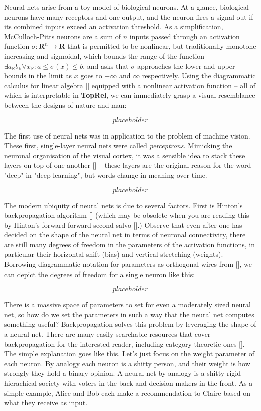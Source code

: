 \begin{fullwidth}
Neural nets arise from a toy model of biological neurons. At a glance, biological neurons have many receptors and one output, and the neuron fires a signal out if its combined inputs exceed an activation threshold. As a simplification, McCulloch-Pitts neurons are a sum of $n$ inputs passed through an activation function $\sigma: \mathbf{R}^n \rightarrow \mathbf{R}$ that is permitted to be nonlinear, but traditionally monotone increasing and sigmoidal, which bounds the range of the function $\exists a_{\mathbb{R}} b_{\mathbb{R}} \forall x_{\mathbb{R}} : a \leq \sigma(x) \leq b$, and asks that $\sigma$ approaches the lower and upper bounds in the limit as $x$ goes to $-\infty$ and $\infty$ respectively. Using the diagrammatic calculus for linear algebra [] equipped with a nonlinear activation function -- all of which is interpretable in \textbf{TopRel}, we can immediately grasp a visual resemblance between the designs of nature and man:

\[placeholder\]

The first use of neural nets was in application to the problem of machine vision. These first, single-layer neural nets were called \emph{perceptrons}. Mimicking the neuronal organisation of the visual cortex, it was a sensible idea to stack these layers on top of one another [] -- these layers are the original reason for the word "deep" in "deep learning", but words change in meaning over time.

\[placeholder\]

The modern ubiquity of neural nets is due to several factors. First is Hinton's backpropagation algorithm [] (which may be obsolete when you are reading this by Hinton's forward-forward second salvo [].) Observe that even after one has decided on the shape of the neural net in terms of neuronal connectivity, there are still many degrees of freedom in the parameters of the activation functions, in particular their horizontal shift (bias) and vertical stretching (weights). Borrowing diagrammatic notation for parameters as orthogonal wires from [], we can depict the degrees of freedom for a single neuron like this:

\[placeholder\]

There is a massive space of parameters to set for even a moderately sized neural net, so how do we set the parameters in such a way that the neural net computes something useful? Backpropagation solves this problem by leveraging the shape of a neural net. There are many easily searchable resources that cover backpropagation for the interested reader, including category-theoretic ones []. The simple explanation goes like this. Let's just focus on the weight parameter of each neuron. By analogy each neuron is a shitty person, and their weight is how strongly they hold a binary opinion. A neural net by analogy is a shitty rigid hierachical society with voters in the back and decision makers in the front. As a simple example, Alice and Bob each make a recommendation to Claire based on what they receive as input.


\end{fullwidth}
